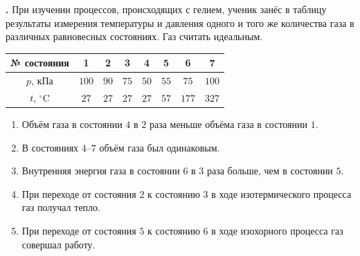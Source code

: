 \documentclass[12pt,a4paper]{article}
\newif\ifShowSolutions
\newcounter{banktask}
\newcommand{\BankTask}[3]{%
  \refstepcounter{banktask}%
  \Needspace{35mm}\par\medskip\noindent\begin{minipage}{\linewidth}%
  \noindent\textbf{\thebanktask.}\quad #2\par
  \ifShowSolutions
    #3\par
    \ifdefined\TutorEdition
      \ifcsname TutorSource#1\endcsname
        \smallskip{\small\csname TutorSource#1\endcsname\par}%
      \fi
    \fi
  \fi
  \end{minipage}\par\medskip
}
\begin{document}
\BankTask{E27EA7}{
При изучении процессов, происходящих с гелием, ученик занёс в таблицу результаты измерения температуры и давления одного и того же количества газа в различных равновесных состояниях. Газ считать идеальным.
\begin{center}
\begin{tabular}{|c|c|c|c|c|c|c|c|}
\hline
№ состояния & 1 & 2 & 3 & 4 & 5 & 6 & 7 \\
\hline
$p,\,\text{кПа}$ & $100$ & $90$ & $75$ & $50$ & $55$ & $75$ & $100$ \\
\hline
$t$, ${}^{\circ}\mathrm{C}$ & $27$ & $27$ & $27$ & $27$ & $57$ & $177$ & $327$ \\
\hline
\end{tabular}
\end{center}
\begin{enumerate}
\item Объём газа в состоянии $4$ в $2$ раза меньше объёма газа в состоянии $1$.
\item В состояниях $4$--$7$ объём газа был одинаковым.
\item Внутренняя энергия газа в состоянии $6$ в $3$ раза больше, чем в состоянии $5$.
\item При переходе от состояния $2$ к состоянию $3$ в ходе изотермического процесса газ получал тепло.
\item При переходе от состояния $5$ к состоянию $6$ в ходе изохорного процесса газ совершал работу.
\end{enumerate}
}{
\smallskip\noindent\textbf{Решение от GPT}\par
Для данного количества газа $V=\nu RT/p$, а для гелия $U=\frac32\nu RT$. Температуры состояний: $300$, $300$, $300$, $300$, $330$, $450$, $600\ \text{К}$.
\begin{enumerate}
\item Неверно: $V_4/V_1=p_1/p_4=2$, то есть объём больше в $2$ раза.
\item Верно: $T_4/p_4=T_5/p_5=T_6/p_6=T_7/p_7=6\ \text{К}/\text{кПа}$, поэтому объёмы одинаковы.
\item Неверно: $U_6/U_5=T_6/T_5=450/330=15/11\ne3$.
\item Верно: при постоянной температуре давление уменьшается, газ расширяется; $\Delta U=0$, $Q=A>0$.
\item Неверно: при изохорном процессе $A=0$.
\end{enumerate}
Ответ: $24$.
}
\end{document}
